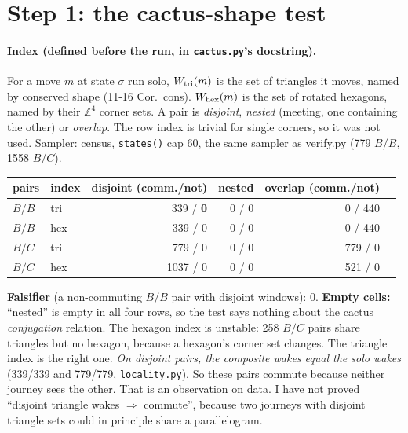 \documentclass[11pt]{article}
\theoremstyle{definition}
\begin{document}
\section{Step 1: the cactus-shape test}
\paragraph{Index (defined before the run, in \texttt{cactus.py}'s docstring).} For a move $m$ at state $\sigma$ run solo,
$W_{\rm tri}(m)$ is the set of triangles it moves, named by conserved shape (11-16 Cor.~cons). $W_{\rm hex}(m)$ is the set of rotated
hexagons, named by their $\mathbb Z^4$ corner sets. A pair is \emph{disjoint}, \emph{nested} (meeting, one containing the other) or
\emph{overlap}. The row index is trivial for single corners, so it was not used. Sampler: census, \texttt{states()} cap 60, the same sampler as verify.py (779 $B/B$, 1558 $B/C$).
\begin{center}\begin{tabular}{llrrrr}\toprule
pairs & index & disjoint (comm./not) & nested & overlap (comm./not)\\\midrule
$B/B$ & tri & 339 / \textbf{0} & 0 / 0 & 0 / 440\\
$B/B$ & hex & 339 / 0 & 0 / 0 & 0 / 440\\
$B/C$ & tri & 779 / 0 & 0 / 0 & 779 / 0\\
$B/C$ & hex & 1037 / 0 & 0 / 0 & 521 / 0\\\bottomrule
\end{tabular}\end{center}
\textbf{Falsifier} (a non-commuting $B/B$ pair with disjoint windows): $0$. \textbf{Empty cells:} ``nested'' is empty in all four rows, so the test
says nothing about the cactus \emph{conjugation} relation. The hexagon index is unstable: 258 $B/C$ pairs share triangles but no hexagon,
because a hexagon's corner set changes. The triangle index is the right one.
\emph{On disjoint pairs, the composite wakes equal the solo wakes} (339/339 and 779/779, \texttt{locality.py}). So these pairs commute
because neither journey sees the other. That is an observation on data. I have not proved ``disjoint triangle wakes $\Rightarrow$ commute'', because
two journeys with disjoint triangle sets could in principle share a parallelogram.
\end{document}
